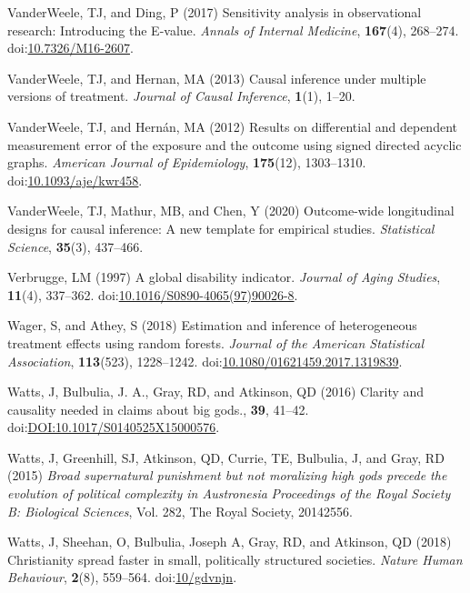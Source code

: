 \documentclass[
  single column]{article}
\newlength{\cslhangindent}
\newenvironment{CSLReferences}[2] %
 {\begin{list}{}{%
  \setlength{\itemindent}{0pt}
  \setlength{\leftmargin}{0pt}
  \setlength{\parsep}{0pt}
  \ifodd #1
   \setlength{\leftmargin}{\cslhangindent}
   \setlength{\itemindent}{-1\cslhangindent}
  \fi
  \setlength{\itemsep}{#2\baselineskip}}}
 {\end{list}}
\begin{document}
\begin{CSLReferences}{1}{0}
VanderWeele, TJ, and Ding, P (2017) Sensitivity analysis in
observational research: Introducing the {E}-value. \emph{Annals of
Internal Medicine}, \textbf{167}(4), 268--274.
doi:\href{https://doi.org/10.7326/M16-2607}{10.7326/M16-2607}.

VanderWeele, TJ, and Hernan, MA (2013) Causal inference under multiple
versions of treatment. \emph{Journal of Causal Inference},
\textbf{1}(1), 1--20.

VanderWeele, TJ, and Hernán, MA (2012) Results on differential and
dependent measurement error of the exposure and the outcome using signed
directed acyclic graphs. \emph{American Journal of Epidemiology},
\textbf{175}(12), 1303--1310.
doi:\href{https://doi.org/10.1093/aje/kwr458}{10.1093/aje/kwr458}.

VanderWeele, TJ, Mathur, MB, and Chen, Y (2020) Outcome-wide
longitudinal designs for causal inference: A new template for empirical
studies. \emph{Statistical Science}, \textbf{35}(3), 437--466.

Verbrugge, LM (1997) A global disability indicator. \emph{Journal of
Aging Studies}, \textbf{11}(4), 337--362.
doi:\href{https://doi.org/10.1016/S0890-4065(97)90026-8}{10.1016/S0890-4065(97)90026-8}.

Wager, S, and Athey, S (2018) Estimation and inference of heterogeneous
treatment effects using random forests. \emph{Journal of the American
Statistical Association}, \textbf{113}(523), 1228--1242.
doi:\href{https://doi.org/10.1080/01621459.2017.1319839}{10.1080/01621459.2017.1319839}.

Watts, J, Bulbulia, J. A., Gray, RD, and Atkinson, QD (2016) Clarity and
causality needed in claims about big gods., \textbf{39}, 41--42.
doi:\href{https://doi.org/DOI:10.1017/S0140525X15000576}{DOI:10.1017/S0140525X15000576}.

Watts, J, Greenhill, SJ, Atkinson, QD, Currie, TE, Bulbulia, J, and
Gray, RD (2015) \emph{Broad supernatural punishment but not moralizing
high gods precede the evolution of political complexity in
{A}ustronesia} \emph{Proceedings of the Royal Society B: Biological
Sciences}, Vol. 282, The Royal Society, 20142556.

Watts, J, Sheehan, O, Bulbulia, Joseph A, Gray, RD, and Atkinson, QD
(2018) Christianity spread faster in small, politically structured
societies. \emph{Nature Human Behaviour}, \textbf{2}(8), 559--564.
doi:\href{https://doi.org/10/gdvnjn}{10/gdvnjn}.


\end{CSLReferences}
\end{document}
